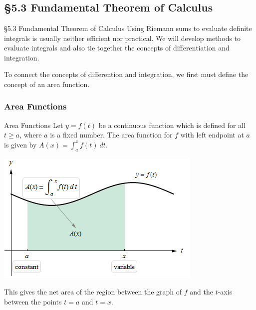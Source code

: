 \documentclass[cal1spr16Lectures.tex]{subfiles}
\begin{document}
\section[]{}

\subsection[5.3 Fundamental Theorem of Calculus]{\S 5.3 Fundamental Theorem of Calculus}

\begin{frame}{\S 5.3 Fundamental Theorem of Calculus}
Using Riemann sums to evaluate definite integrals is usually neither efficient nor practical.  We will develop methods to evaluate integrals and also tie together the concepts of differentiation and integration. 

\vspace{0.5pc}
To connect the concepts of differention and integration, we first must define the concept of an area function.
\end{frame}

\subsubsection{Area Functions}

\begin{frame}{\small Area Functions}\footnotesize
Let $y=f(t)$ be a continuous function which is defined for all $t \ge a$, where $a$ is a fixed number.  The area function for $f$ with left endpoint at $a$ is given by 
%
$A(x)=\int_a^x f(t)\ dt$.%

\vspace{-1pc}
\begin{center}
\includegraphics[scale=0.55]{pictures/Fig5_32}
\end{center}

\vspace{-1.5pc}
This gives the net area of the region between the graph of $f$ and the $t$-axis between the points $t=a$ and $t=x$.  %
\end{frame}
\end{document}

